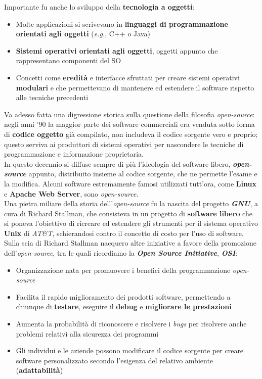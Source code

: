 \documentclass[12pt, letterpaper]{article}
\begin{document}
Importante fu anche lo sviluppo della \textbf{tecnologia a oggetti}:
\begin{itemize}
    \item Molte applicazioni si scrivevano in \textbf{linguaggi di programmazione orientati agli oggetti} (\textit{e.g.}, C++ o Java)
    \item \textbf{Sistemi operativi orientati agli oggetti}, oggetti appunto che rappresentano componenti del SO
    \item Concetti come \textbf{eredità} e interfacce sfruttati per creare sistemi operativi \textbf{modulari} e che permettevano di mantenere ed estendere il software rispetto alle tecniche precedenti
\end{itemize}
Va adesso fatta una digressione storica sulla questione della filosofia \textit{open-source}: negli anni '90 la maggior parte dei software commerciali era venduta sotto forma di \textbf{codice oggetto} già compilato, non includeva il codice sorgente vero e proprio; questo serviva ai produttori di sistemi operativi per nascondere le tecniche di programmazione e informazione proprietaria. \\
In questo decennio si diffuse sempre di più l'ideologia del software libero, \textit{\textbf{open-source}} appunto, distribuito insieme al codice sorgente, che ne permette l'esame e la modifica. Alcuni software estremamente famosi utilizzati tutt'ora, come \textbf{Linux} e \textbf{Apache Web Server}, sono \textit{open-source}. \\
Una pietra miliare della storia dell'\textit{open-source} fu la nascita del progetto \textit{\textbf{GNU}}, a cura di Richard Stallman, che consisteva in un progetto di \textbf{software libero} che si poneva l'obiettivo di ricreare ed estendere gli strumenti per il sistema operativo \textbf{Unix} di \textit{AT\&T}, schierandosi contro il concetto di costo per l'uso di software. \\
Sulla scia di Richard Stallman nacquero altre iniziative a favore della promozione dell'\textit{open-source}, tra le quali ricordiamo la \textit{\textbf{Open Source Initiative}}, \textit{\textbf{OSI}}:
\begin{itemize}
    \item Organizzazione nata per promuovere i benefici della programmazione \textit{open-source}
    \item Facilita il rapido miglioramento dei prodotti software, permettendo a chiunque di \textbf{testare},
        eseguire il \textbf{debug} e \textbf{migliorare le prestazioni}
    \item Aumenta la probabilità di riconoscere e risolvere i \textit{bugs} per risolvere anche problemi relativi alla sicurezza dei programmi
    \item Gli individui e le aziende possono modificare il codice sorgente per creare software personalizzato secondo l'esigenza del relativo ambiente (\textbf{adattabilità})
\end{itemize}
\end{document}
